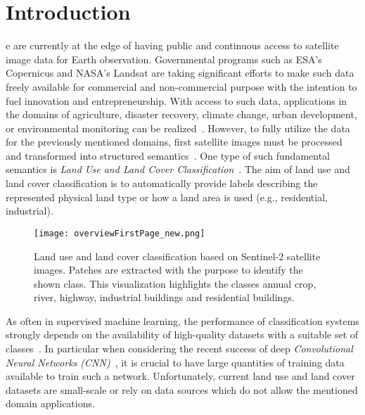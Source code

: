 \documentclass[journal]{IEEEtran}
\begin{document}
\section{Introduction}
% 
% 
% 
% 
e are currently at the edge of having public and continuous access to satellite image data for Earth observation. Governmental programs such as ESA's Copernicus and NASA's Landsat are taking significant efforts to make such data freely available for commercial and non-commercial purpose with the intention to fuel innovation and entrepreneurship. With access to such data, applications in the domains of agriculture, disaster recovery, climate change, urban development, or environmental monitoring
can be realized~\cite{ponti2016precision, bischke2017multimediaSatelliteSolution, bischke2016contextual, bischke2017multimediaSatellite}. However, to fully utilize the data for the previously mentioned
domains, first satellite images must be processed and transformed into structured 
semantics~\cite{huang2018opensarship}. One type of such fundamental semantics is \textit{Land Use and Land Cover Classification}~\cite{basu2015deepsat, yang2010bag}. The aim of land use and land cover classification is to automatically provide labels describing the represented physical land type or how a land area is used (e.g., residential, industrial).

\begin{figure}[t]
	\centering
	\texttt{[image: overviewFirstPage\_new.png]}
	\caption{Land use and land cover classification based on Sentinel-2 satellite images. Patches are extracted with the purpose to identify the shown class. This visualization highlights the classes annual crop, river, highway, industrial buildings and residential buildings.}
	\label{fig:overview}
\end{figure}

As often in supervised machine learning, the performance of classification systems strongly depends on the availability of high-quality datasets with a suitable set of classes~\cite{ILSVRC15}. 
In particular when considering the recent success of deep \textit{Convolutional Neural 
Networks (CNN)}~\cite{krizhevsky2012imagenet}, it is crucial to have large quantities of training data available to train such a network. Unfortunately, current land use and land cover datasets are small-scale or rely on data sources which do not allow the mentioned domain applications. %
\end{document}
